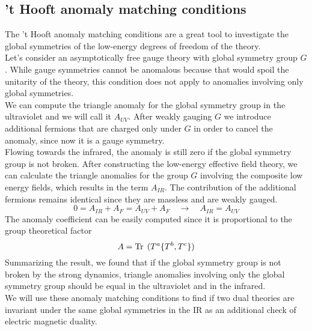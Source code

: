 \subsection{'t Hooft anomaly matching conditions}

The 't Hooft anomaly matching conditions are a great tool to investigate the global symmetries of the low-energy degrees of freedom of the theory.\\ 
Let's consider an asymptotically free gauge theory with global symmetry group $G$. 
While gauge symmetries cannot be anomalous because that would spoil the unitarity of the theory, this condition does not apply to anomalies involving only global symmetries.\\
We can compute the triangle anomaly for the global symmetry group in the ultraviolet and we will call it $A_{UV}$. 
After weakly gauging $G$ we introduce additional fermions that are charged only under $G$ in order to cancel the anomaly, since now it is a gauge symmetry.\\
Flowing towards the infrared, the anomaly is still zero if the global symmetry group is not broken.
After constructing the low-energy effective field theory, 
we can calculate the triangle anomalies for the group $G$ involving the composite low energy fields, which results in the term $A_{IR}$.
The contribution of the additional fermions remains identical since they are massless and are weakly gauged.
\begin{equation}
 0 = A_{IR} + A_{F} = A_{UV} + A_{F} \quad \rightarrow \quad A_{IR} = A_{UV}
\end{equation}
The anomaly coefficient can be easily computed since it is proportional to the group theoretical factor
\begin{equation}
 A = \mathrm{Tr } \, \; ( T^a \{ T^b, T^c \})
\end{equation}
Summarizing the result, we found that if the global symmetry group is not broken by the strong dynamics, triangle anomalies involving only the global symmetry group should be equal in the ultraviolet and in the infrared.\\
We will use these anomaly matching conditions to find if two dual theories are invariant under the same global symmetries in the IR as an additional check of electric magnetic duality.


